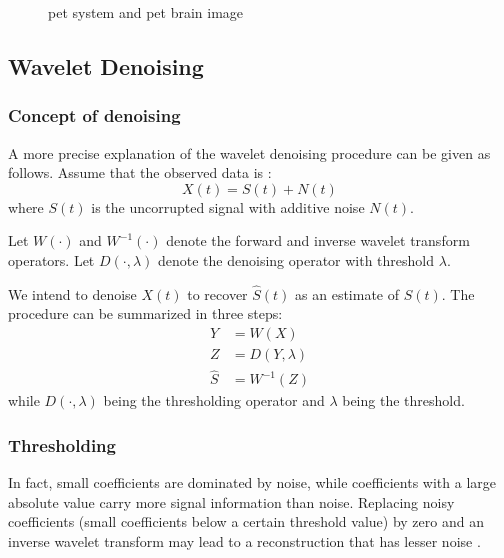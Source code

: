 \begin{figure}[h]
\begin{subfigure}[b]{0.35\textwidth}
		\label{fig:pet_brain}
	\end{subfigure}
	\caption{\gls{pet} system and \gls{pet} brain image}\label{fig:pet_image}
\end{figure}


\subsection{Wavelet Denoising}

\subsubsection*{Concept of denoising}
A more precise explanation of the wavelet denoising
procedure can be given as follows. Assume that the
observed data is \cite{rangarajan2002image}:
\begin{equation}
X(t)=S(t)+N(t)
\end{equation}
where $S(t)$ is the uncorrupted signal with additive
noise $N(t)$. 

Let $W(\cdot)$ and $W^{-1}(\cdot)$ denote the forward
and inverse wavelet transform operators. Let $D(\cdot, \lambda)$ denote the denoising operator with threshold $\lambda$. 

We intend to denoise $X(t)$ to recover $\hat{S}(t)$ as an estimate
of $S(t)$. The procedure can be summarized in three
steps:
\begin{subequations}
	\begin{align}
	Y &= W(X)\\
	Z &= D(Y,\lambda)\\
	\hat{S} &= W^{-1}(Z)
	\end{align}
	\label{eqn:wavelet_denoise}
\end{subequations}
while $D(\cdot,\lambda)$ being the thresholding operator and $\lambda$ being the threshold.

\subsubsection*{Thresholding}
In fact, small coefficients are dominated by noise, while coefficients with a large absolute value carry more signal information than noise. Replacing noisy coefficients (small coefficients below a certain threshold value) by zero and an inverse wavelet transform may lead to a reconstruction that has lesser noise \cite{rangarajan2002image}.

